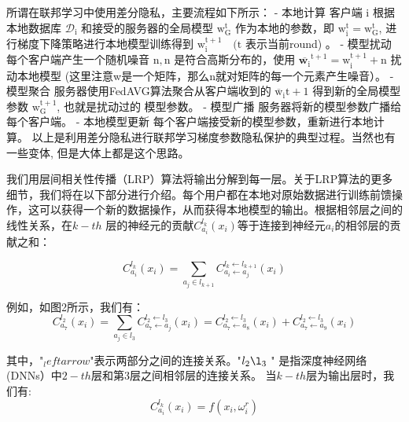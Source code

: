所谓在联邦学习中使用差分隐私，主要流程如下所示：
- 本地计算
客户端 $\mathrm{i}$ 根据本地数据库 $\mathcal{D}_{\mathrm{i}}$ 和接受的服务器的全局模型 $\mathrm{w}_{\mathrm{G}}^{\mathrm{t}}$ 作为本地的参数，即 $\mathrm{w}_{\mathrm{i}}^{\mathrm{t}}=\mathrm{w}_{\mathrm{G}}^{\mathrm{t}}$, 进 行梯度下降策略进行本地模型训练得到 $\mathrm{w}_{\mathrm{i}}^{\mathrm{t}+1} \quad(\mathrm{t}$ 表示当前round) 。
- 模型扰动
每个客户端产生一个随机噪音 $\mathrm{n}, \mathrm{n}$ 是符合高斯分布的，使用 $\overline{\mathbf{w}_{\mathrm{i}}}^{\mathrm{t}+1}=\mathrm{w}_{\mathrm{i}}^{\mathrm{t}+1}+\mathrm{n}$ 扰动本地模型 (这里注意w是一个矩阵，那么n就对矩阵的每一个元素产生噪音）。
- 模型聚合
服务器使用FedAVG算法聚合从客户端收到的 $\overline{\mathrm{w}}_{\mathrm{i}} \mathrm{t}+1$ 得到新的全局模型参数 $\mathrm{w}_{\mathrm{G}}^{\mathrm{t}+1}$, 也就是扰动过的 模型参数。
- 模型广播
服务器将新的模型参数广播给每个客户端。
- 本地模型更新
每个客户端接受新的模型参数，重新进行本地计算。
以上是利用差分隐私进行联邦学习梯度参数隐私保护的典型过程。当然也有一些变体, 但是大体上都是这个思路。


我们用层间相关性传播（LRP）算法将输出分解到每一层。关于LRP算法的更多细节，我们将在以下部分进行介绍。每个用户都在本地对原始数据进行训练前馈操作，这可以获得一个新的数据操作，从而获得本地模型的输出。根据相邻层之间的线性关系，在$k-t h$ 层的神经元的贡献$C_{a_{i}}^{l_{k}}\left(x_{i}\right)$等于连接到神经元$a_{i}$的相邻层的贡献之和：

$$
C_{a_{i}}^{l_{k}}\left(x_{i}\right)=\sum_{a_{j} \in l_{k+1}} C_{a_{i} \leftarrow a_{j}}^{l_{k} \leftarrow l_{k+1}}\left(x_{i}\right)
$$


例如，如图2所示，我们有：
$$
C_{a_{7}}^{l_{2}}\left(x_{i}\right)=\sum_{a_{j} \in l_{3}} C_{a_{7} \leftarrow a_{j}}^{l_{2} \leftarrow l_{3}}\left(x_{i}\right)=C_{a_{7} \leftarrow a_{8}}^{l_{2} \leftarrow l_{3}}\left(x_{i}\right)+C_{a_{7} \leftarrow a_{9}}^{l_{2} \leftarrow l_{3}}\left(x_{i}\right)
$$

其中，"$_leftarrow$"表示两部分之间的连接关系。"$l_{2} \l_{3}$ " 是指深度神经网络(DNNs）中$2-t h$层和第3层之间相邻层的连接关系。
当$k-t h$层为输出层时，我们有:
$$
C_{a_{i}}^{l_{k}}\left(x_{i}\right)=f\left(x_{i}, \omega_{i}^{r}\right)
$$

